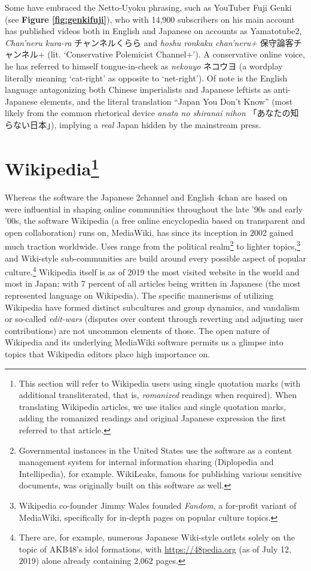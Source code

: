 \documentclass[10pt,british,A4paper,twoside]{memoir}
\begin{document}
Some have embraced the Netto-Uyoku phrasing, such as YouTuber Fuji Genki
(see \textbf{Figure \ref{fig:genkifuji}}), who with 14,900 subscribers
on his main account has published videos both in English and Japanese on
accounts as Yamatotube2, \emph{Chan'neru kura-ra} チャンネルくらら and
\emph{hoshu ronkaku chan'neru+} 保守論客チャンネル+ (lit. `Conservative
Polemicist Channel+'). A conservative online voice, he has referred to
himself tongue-in-cheek as \emph{nekouyo} ネコウヨ (a wordplay literally
meaning `cat-right' as opposite to `net-right'). Of note is the English
language antagonizing both Chinese imperialists and Japanese leftists as
anti-Japanese elements, and the literal translation ``Japan You Don't
Know'' (most likely from the common rhetorical device \emph{anata no
shiranai nihon} 「あなたの知らない日本」), implying a \emph{real} Japan
hidden by the mainstream press.

\section[Wikipedia]{\texorpdfstring{Wikipedia\footnote{This section will
  refer to Wikipedia users using single quotation marks (with additional
  transliterated, that is, \emph{romanized} readings when required).
  When translating Wikipedia articles, we use italics and single
  quotation marks, adding the romanized readings and original Japanese
  expression the first referred to that article.}}{Wikipedia}}\label{wikipedia76}

Whereas the software the Japanese 2channel and English 4chan are based
on were influential in shaping online communities throughout the late
'90s and early '00s, the software Wikipedia (a free online encyclopedia
based on transparent and open collaboration) runs on, MediaWiki, has
since its inception in 2002 gained much traction worldwide. Uses range
from the political realm\footnote{Governmental instances in the United
  States use the software as a content management system for internal
  information sharing (Diplopedia and Intellipedia), for example.
  WikiLeaks, famous for publishing various sensitive documents, was
  originally built on this software as well.} to lighter
topics,\footnote{Wikipedia co-founder Jimmy Wales founded \emph{Fandom},
  a for-profit variant of MediaWiki, specifically for in-depth pages on
  popular culture topics.} and Wiki-style sub-communities are build
around every possible aspect of popular culture.\footnote{There are, for
  example, numerous Japanese Wiki-style outlets solely on the topic of
  AKB48's idol formations, with \url{https://48pedia.org} (as of July 12, 2019) alone already containing 2,062 pages.} Wikipedia itself is
as of 2019 the  most visited website in the world and 
most in Japan; with 7 percent of all articles being written in Japanese
(the  most represented language on Wikipedia). The specific
mannerisms of utilizing Wikipedia have formed distinct subcultures and
group dynamics, and vandalism or so-called \emph{edit-wars} (disputes
over content through reverting and adjusting user contributions) are not
uncommon elements of those. The open nature of Wikipedia and its
underlying MediaWiki software permits us a glimpse into topics that
Wikipedia editors place high importance on.
\end{document}
